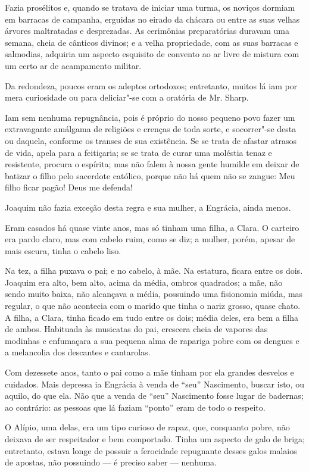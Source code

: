 Fazia prosélitos e, quando se tratava de iniciar uma turma, os noviços
dormiam em barracas de campanha, erguidas no eirado da chácara ou entre
as suas velhas árvores maltratadas e desprezadas. As cerimônias
preparatórias duravam uma semana, cheia de cânticos divinos; e a velha
propriedade, com as suas barracas e salmodias, adquiria um aspecto
esquisito de convento ao ar livre de mistura com um certo ar de
acampamento militar.

Da redondeza, poucos eram os adeptos ortodoxos; entretanto, muitos lá
iam por mera curiosidade ou para deliciar"-se com a oratória de Mr.
Sharp.

Iam sem nenhuma repugnância, pois é próprio do nosso pequeno povo fazer
um extravagante amálgama de religiões e crenças de toda sorte, e
socorrer"-se desta ou daquela, conforme os transes de sua existência. Se
se trata de afastar atrasos de vida, apela para a feitiçaria; se se
trata de curar uma moléstia tenaz e resistente, procura o espírita; mas
não falem à nossa gente humilde em deixar de batizar o filho pelo
sacerdote católico, porque não há quem não se zangue: Meu filho ficar
pagão! Deus me defenda!

Joaquim não fazia exceção desta regra e sua mulher, a Engrácia, ainda
menos.

Eram casados há quase vinte anos, mas só tinham uma filha, a Clara. O
carteiro era pardo claro, mas com cabelo ruim, como se diz; a mulher,
porém, apesar de mais escura, tinha o cabelo liso.

Na tez, a filha puxava o pai; e no cabelo, à mãe. Na estatura, ficara
entre os dois. Joaquim era alto, bem alto, acima da média, ombros
quadrados; a mãe, não sendo muito baixa, não alcançava a média,
possuindo uma fisionomia miúda, mas regular, o que não acontecia com o
marido que tinha o nariz grosso, quase chato. A filha, a Clara, tinha
ficado em tudo entre os dois; média deles, era bem a filha de ambos.
Habituada às musicatas do pai, crescera cheia de vapores das modinhas e
enfumaçara a sua pequena alma de rapariga pobre com os dengues e a
melancolia dos descantes e cantarolas.

Com dezessete anos, tanto o pai como a mãe tinham por ela grandes
desvelos e cuidados. Mais depressa ia Engrácia à venda de ``seu''
Nascimento, buscar isto, ou aquilo, do que ela. Não que a venda de ``seu''
Nascimento fosse lugar de badernas; ao contrário: as pessoas que lá
faziam ``ponto'' eram de todo o respeito.

O Alípio, uma delas, era um tipo curioso de rapaz, que, conquanto pobre,
não deixava de ser respeitador e bem comportado. Tinha um aspecto de
galo de briga; entretanto, estava longe de possuir a ferocidade
repugnante desses galos malaios de apostas, não possuindo --- é preciso
saber --- nenhuma.

